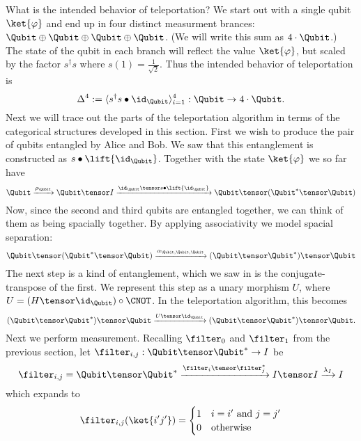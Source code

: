 What is the intended behavior of teleportation? We start out with a single qubit $\ket{\varphi}$
and end up in four distinct measurment brances: $\Qubit \oplus \Qubit \oplus \Qubit \oplus \Qubit$.
(We will write this sum as $4 \cdot \Qubit$.) The state of the qubit in each branch will reflect
the value $\ket{\varphi}$, but scaled by the factor $s^\dagger s$ where $s(1) = \frac 1 {\sqrt{2}}$.
Thus the intended behavior of teleportation is
\[ \Delta^4 := \langle s^\dagger s \bullet \id_\Qubit \rangle_{i=1}^{4} : \Qubit \rightarrow 4 \cdot \Qubit. \]
Next we will trace out the parts of the teleportation algorithm in terms of the categorical 
structures developed in this section.
First we wish to produce the pair of qubits entangled by Alice and Bob. We saw that this entanglement
is constructed as $s \bullet \lift{\id_{\Qubit}}$. Together with the state 
$\ket{\varphi}$ we so far have
\[
    \Qubit \xrightarrow{\rho_\Qubit} \Qubit \tensor I 
    \xrightarrow {\id_\Qubit \tensor s \bullet \lift{\id_\Qubit}} 
    \Qubit \tensor (\Qubit^* \tensor \Qubit)
\]
Now, since the second and third qubits are entangled together, we can think of them as being
spacially together. By applying associativity we model spacial separation:
\[
    \Qubit \tensor (\Qubit^* \tensor \Qubit) 
    \xrightarrow{\alpha_{\Qubit,\Qubit,\Qubit}}
    (\Qubit \tensor \Qubit^*) \tensor \Qubit
\]
The next step is a kind of entanglement, which we saw in  is the 
conjugate-transpose of the first. We represent this step as a unary morphism $U$, where 
$U = (H \tensor \id_\Qubit) \circ \CNOT$. In the teleportation algorithm, this becomes
\[
    (\Qubit \tensor \Qubit^*) \tensor \Qubit
    \xrightarrow{U \tensor \id_\Qubit}
    (\Qubit \tensor \Qubit^*) \tensor \Qubit.
\]
Next we perform measurement. Recalling $\filter_0$ and $\filter_1$ from the previous
section, let $\filter_{i,j} : \Qubit \tensor \Qubit^* \rightarrow I$ be
\[ \filter_{i,j} = \Qubit \tensor \Qubit^*
    \xrightarrow{\filter_i \tensor \filter_j^*}
    I \tensor I
    \xrightarrow{\lambda_I}
    I
\]
which expands to
\[
    \filter_{i,j}(\ket{i'j'}) = \begin{cases}
        1 & i=i' \text{ and } j=j' \\
        0 & \text{otherwise}
    \end{cases}
\]
